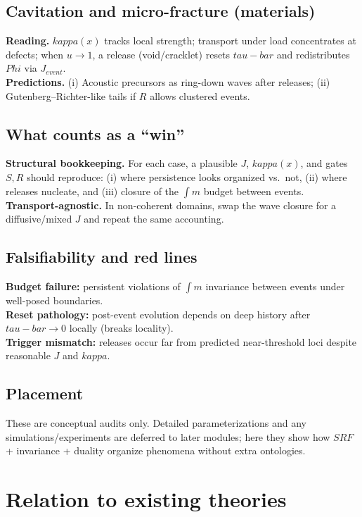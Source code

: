\documentclass[12pt]{article}
\newcommand{\FoldDensity}{\Phi}
\newcommand{\FoldTime}{\bar{\tau}}
\newcommand{\Threshold}{\kappa}
\newcommand{\Survival}{S}
\newcommand{\Release}{R}
\newcommand{\SRF}{\mathcal{F}_{\mathrm{SR}}}
\def\FoldDensity{Phi}%
\def\FoldTime{tau-bar}%
\def\Threshold{kappa}%
\def\SRF{SRF}%
\def\Survival{S}%
\def\Release{R}%
\def\bar#1{#1}%
\def\mathcal#1{#1}%
\def\mathrm#1{#1}%
\begin{document}
\subsection{Cavitation and micro-fracture (materials)}
\textbf{Reading.} $\Threshold(x)$ tracks local strength; transport under load concentrates at defects; when $u\to 1$, a release (void/cracklet) resets $\FoldTime$ and redistributes $\FoldDensity$ via $J_{\mathrm{event}}$.\\
\textbf{Predictions.} (i) Acoustic precursors as ring-down waves after releases; (ii) Gutenberg--Richter-like tails if $\Release$ allows clustered events.

\subsection{What counts as a ``win''}
\textbf{Structural bookkeeping.} For each case, a plausible $J$, $\Threshold(x)$, and gates $\Survival,\Release$ should reproduce: (i) where persistence looks organized vs.\ not, (ii) where releases nucleate, and (iii) closure of the $\int m$ budget between events.\\
\textbf{Transport-agnostic.} In non-coherent domains, swap the wave closure for a diffusive/mixed $J$ and repeat the same accounting.

\subsection{Falsifiability and red lines}
\textbf{Budget failure:} persistent violations of $\int m$ invariance between events under well-posed boundaries.\\
\textbf{Reset pathology:} post-event evolution depends on deep history after $\FoldTime\to 0$ locally (breaks locality).\\
\textbf{Trigger mismatch:} releases occur far from predicted near-threshold loci despite reasonable $J$ and $\Threshold$.

\subsection{Placement}
These are conceptual audits only. Detailed parameterizations and any simulations/experiments are deferred to later modules; here they show how $\SRF$ + invariance + duality organize phenomena without extra ontologies.


\section{Relation to existing theories}
\end{document}
